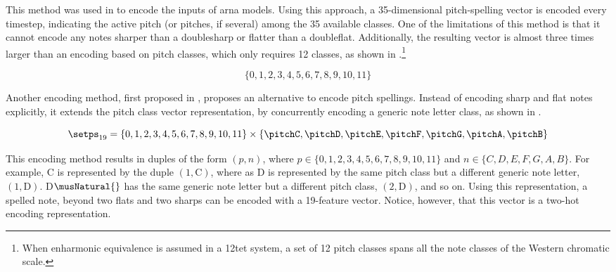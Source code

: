 This method was used in \textcite{micchi2020not,
micchi2021deep} to encode the inputs of \gls{arna} models.
Using this approach, a 35-dimensional pitch-spelling vector
is encoded every timestep, indicating the active pitch (or
pitches, if several) among the 35 available classes. One of
the limitations of this method is that it cannot encode any
notes sharper than a \gls{doublesharp} or flatter than a
\gls{doubleflat}. Additionally, the resulting vector is
almost three times larger than an encoding based on pitch
classes, which only requires 12 classes, as shown in
.\footnote{When enharmonic equivalence
is assumed in a \gls{12tet} system, a set of 12 pitch
classes spans all the note classes of the Western chromatic
scale.}

\begin{equation}
    \label{eq:pitch_classes}
    \{0, 1, 2, 3, 4, 5, 6, 7, 8, 9, 10, 11\}
\end{equation}



Another encoding method, first proposed in
\textcite{napoleslopez2021augmentednet}, proposes an
alternative to encode pitch spellings. Instead of encoding
\gls{sharp} and \gls{flat} notes explicitly, it extends the
pitch class vector representation, by concurrently encoding
a generic note letter class, as shown in
.

\begin{equation}
    \label{eq:pitch_spelling_19}
    \setps_{19} = \{0, 1, 2, 3, 4, 5, 6, 7, 8, 9, 10, 11\} 
    \times \{ \pitchC, \pitchD, \pitchE, \pitchF, \pitchG, \pitchA, \pitchB \}
\end{equation}


This encoding method results in duples of the form $(p, n)$,
where $p \in \{0, 1, 2, 3, 4, 5, 6, 7, 8, 9, 10, 11\}$ and
$n \in \{C, D, E, F, G, A, B\}$. For example, C\musSharp{}
is represented by the duple $(1, \text{C})$, where as
D\musFlat{} is represented by the same pitch class but a
different generic note letter, $(1, \text{D})$.
D$\musNatural{}$ has the same generic note letter but a
different pitch class, $(2, \text{D})$, and so on. Using
this representation, a spelled note, beyond two flats and
two sharps can be encoded with a 19-feature vector. Notice,
however, that this vector is a two-hot encoding
representation.
